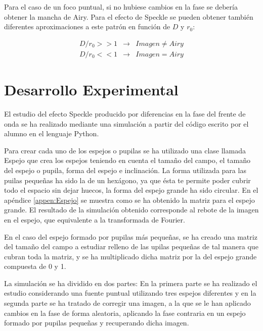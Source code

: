 \documentclass[twoside]{article}
\begin{document}
\begin{multicols}{2}
			Para el caso de un foco puntual, si no hubiese cambios en la fase se debería obtener la mancha de Airy. Para el efecto de Speckle se pueden obtener también diferentes aproximaciones a este patrón en función de $D$ y $r_0$:

				\begin{equation}
					\begin{matrix}
						D/r_0 >> 1 & \rightarrow & Imagen \neq Airy
						\\
						D/r_0 << 1 & \rightarrow & Imagen=Airy
					\end{matrix}
					\label{eq:airy}
				\end{equation}

		\section{Desarrollo Experimental}

			El estudio del efecto Speckle producido por diferencias en la fase del frente de onda se ha realizado mediante una simulación a partir del código \cite{Speckle} escrito por el alumno en el lenguaje Python.

			Para crear cada uno de los espejos o pupilas se ha utilizado una clase llamada Espejo que crea los espejos teniendo en cuenta el tamaño del campo, el tamaño del espejo o pupila, forma del espejo e inclinación. La forma utilizada para las puilas pequeñas ha sido la de un hexágono, ya que ésta te permite poder cubrir todo el espacio sin dejar huecos, la forma del espejo grande ha sido circular. En el apéndice \ref{appen:Espejo} se muestra como se ha obtenido la matriz para el espejo grande. El resultado de la simulación obtenido corresponde al rebote de la imagen en el espejo, que equivalente a la transformada de Fourier.

			En el caso del espejo formado por pupilas más pequeñas, se ha creado una matriz del tamaño del campo a estudiar relleno de las upilas pequeñas de tal manera que cubran toda la matriz, y se ha multiplicado dicha matriz por la del espejo grande compuesta de 0 y 1.

			La simulación se ha dividido en dos partes: En la primera parte se ha realizado el estudio considerando una fuente puntual utilizando tres espejos diferentes y en la segunda parte se ha tratado de corregir una imagen, a la que se le han aplicado cambios en la fase de forma aleatoria, aplicando la fase contraria en un espejo formado por pupilas pequeñas y recuperando dicha imagen.


\end{multicols}
\end{document}
